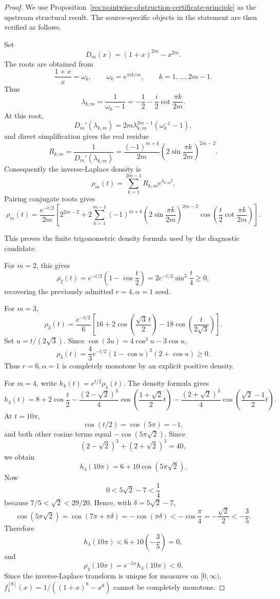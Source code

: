 \documentclass[11pt]{article}
\numberwithin{equation}{section}
\theoremstyle{definition}
\theoremstyle{remark}
\newcommand{\1}{\mathbf 1}
\begin{document}
\begin{proof}
We use Proposition~\ref{res:pointwise-obstruction-certificate-principle} as the upstream structural result. The source-specific objects in the statement are then verified as follows.

Set
\[
D_m(x)=(1+x)^{2m}-x^{2m}.
\]
The roots are obtained from
\[
\frac{1+x}{x}=\omega_k,\qquad
\omega_k=e^{\pi i k/m},\qquad k=1,\ldots,2m-1.
\]
Thus
\[
\lambda_{k,m}
=\frac{1}{\omega_k-1}
=-\frac12-\frac{i}{2}\cot\frac{\pi k}{2m}.
\]
At this root,
\[
D_m'(\lambda_{k,m})
=2m\lambda_{k,m}^{2m-1}(\omega_k^{-1}-1),
\]
and direct simplification gives the real residue
\[
R_{k,m}
=\frac{1}{D_m'(\lambda_{k,m})}
=\frac{(-1)^{m+k}}{2m}
\left(2\sin\frac{\pi k}{2m}\right)^{2m-2}.
\]
Consequently the inverse-Laplace density is
\[
\rho_m(t)
=\sum_{k=1}^{2m-1}R_{k,m}e^{\lambda_{k,m}t}.
\]
Pairing conjugate roots gives
\[
\rho_m(t)
=\frac{e^{-t/2}}{2m}
\left[
2^{2m-2}
+2\sum_{k=1}^{m-1}
(-1)^{m+k}
\left(2\sin\frac{\pi k}{2m}\right)^{2m-2}
\cos\!\left(
\frac{t}{2}\cot\frac{\pi k}{2m}
\right)
\right].
\]

This proves the finite trigonometric density formula used by the diagnostic
candidate.

For \(m=2\), this gives
\[
\rho_2(t)=e^{-t/2}\left(1-\cos\frac t2\right)
=2e^{-t/2}\sin^2\frac t4\ge0,
\]
recovering the previously admitted \(r=4,\alpha=1\) seed.

For \(m=3\),
\[
\rho_3(t)
=\frac{e^{-t/2}}6
\left[
16+2\cos\left(\frac{\sqrt3\,t}{2}\right)
-18\cos\left(\frac{t}{2\sqrt3}\right)
\right].
\]
Set \(u=t/(2\sqrt3)\).  Since
\(\cos(3u)=4\cos^3u-3\cos u\),
\[
\rho_3(t)
=\frac{4}{3}e^{-t/2}(1-\cos u)^2(2+\cos u)\ge0.
\]
Thus \(r=6,\alpha=1\) is completely monotone by an explicit positive density.

For \(m=4\), write \(h_4(t)=e^{t/2}\rho_4(t)\).  The density formula gives
\[
h_4(t)
=8+2\cos\frac t2
-\frac{(2-\sqrt2)^3}{4}
\cos\left(\frac{1+\sqrt2}{2}t\right)
-\frac{(2+\sqrt2)^3}{4}
\cos\left(\frac{\sqrt2-1}{2}t\right).
\]
At \(t=10\pi\),
\[
\cos(t/2)=\cos(5\pi)=-1,
\]
and both other cosine terms equal \(-\cos(5\pi\sqrt2)\).  Since
\[
(2-\sqrt2)^3+(2+\sqrt2)^3=40,
\]
we obtain
\[
h_4(10\pi)=6+10\cos(5\pi\sqrt2).
\]
Now
\[
0<5\sqrt2-7<\frac14
\]
because \(7/5<\sqrt2<29/20\).  Hence, with
\(\delta=5\sqrt2-7\),
\[
\cos(5\pi\sqrt2)=\cos(7\pi+\pi\delta)=-\cos(\pi\delta)
<-\cos\frac\pi4=-\frac{\sqrt2}{2}<-\frac35.
\]
Therefore
\[
h_4(10\pi)<6+10\left(-\frac35\right)=0,
\]
and
\[
\rho_4(10\pi)=e^{-5\pi}h_4(10\pi)<0.
\]
Since the inverse-Laplace transform is unique for measures on
\([0,\infty)\), \(f^{[8]}_1(x)=1/((1+x)^8-x^8)\) cannot be completely monotone.
\end{proof}
\end{document}
